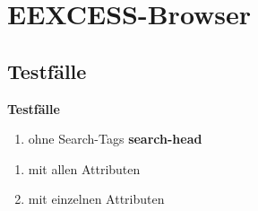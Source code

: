 \chapter{EEXCESS-Browser}

\section{Testfälle}


\centering \textbf{{\large Testfälle}}
\begin{enumerate}
\item ohne Search-Tags
\flushleft \textbf{search-head}

\end{enumerate}
\begin{enumerate}
  \item mit allen Attributen
  \item mit einzelnen Attributen


\end{enumerate}
